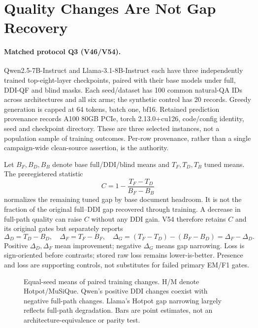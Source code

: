 \section{Quality Changes Are Not Gap Recovery}
\label{app:quality}

\paragraph{Matched protocol Q3 (V46/V54).}
Qwen2.5-7B-Instruct and Llama-3.1-8B-Instruct each have three independently
trained top-eight-layer checkpoints, paired with their base models under full,
DDI-QF and blind masks. Each seed/dataset has 100 common natural-QA IDs across
architectures and all six arms; the synthetic control has 20 records. Greedy
generation is capped at 64 tokens, batch one, bf16. Retained prediction
provenance records A100 80GB PCIe, torch 2.13.0+cu126, code/config identity,
seed and checkpoint directory. These are three selected instances, not a
population sample of training outcomes. Per-row provenance, rather than a
single campaign-wide clean-source assertion, is the authority.

Let $B_F,B_D,B_B$ denote base full/DDI/blind means and $T_F,T_D,T_B$ tuned
means. The preregistered statistic
\begin{equation}
C=1-\frac{T_F-T_D}{B_F-B_B}
\end{equation}
normalizes the remaining tuned gap by base document headroom. It is not the
fraction of the original full--DDI gap recovered through training. A decrease
in full-path quality can raise $C$ without any DDI gain. V54 therefore retains
$C$ and its original gates but separately reports
\begin{equation}
\Delta_D=T_D-B_D,\quad\Delta_F=T_F-B_F,\quad
\Delta_G=(T_F-T_D)-(B_F-B_D)=\Delta_F-\Delta_D.
\end{equation}
Positive $\Delta_D,\Delta_F$ mean improvement; negative $\Delta_G$ means gap
narrowing. Loss is sign-oriented before contrasts; stored raw loss remains
lower-is-better. Presence and loss are supporting controls, not substitutes for
failed primary EM/F1 gates.

\begin{figure}[H]
\centering
\caption{Equal-seed means of paired training changes. H/M denote Hotpot/MuSiQue.
Qwen's positive DDI changes coexist with negative full-path changes. Llama's
Hotpot gap narrowing largely reflects full-path degradation. Bars are point
estimates, not an architecture-equivalence or parity test.}
\end{figure}

